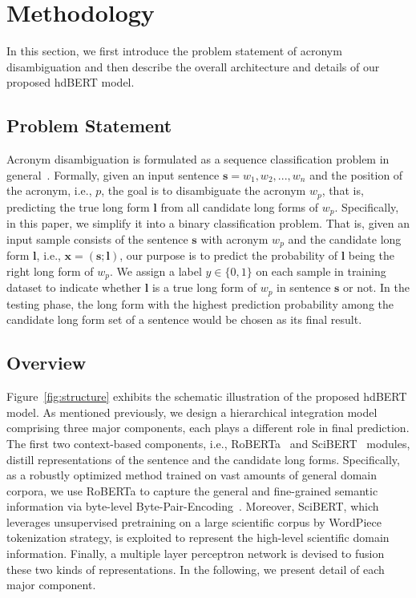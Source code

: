 \section{Methodology}
\label{sec:methodology}
In this section, we first introduce the problem statement of acronym disambiguation and then describe the overall architecture and details of our proposed hdBERT model.
\subsection{Problem Statement}
Acronym disambiguation is formulated as a sequence classification problem in general~\cite{veyseh-et-al-2020-what}.
Formally, given an input sentence $\bm{s}=w_1, w_2, ..., w_n$ and the position of the acronym, i.e., $p$, the goal is to disambiguate the acronym $w_p$, that is, predicting the true long form $\bm{l}$ from all candidate long forms of $w_p$.
Specifically, in this paper, we simplify it into a binary classification problem. That is, given an input sample consists of the sentence $\bm{s}$ with acronym $w_p$ and the candidate long form $\bm{l}$, i.e., $\bm{x}=(\bm{s}; \bm{l})$, our purpose is to predict the probability of $\bm{l}$ being the right long form of $w_p$. 
We assign a label $y \in \{0,1\}$ on each sample in training dataset to indicate whether $\bm{l}$ is a true long form of $w_p$ in sentence $\bm{s}$ or not.
In the testing phase, the long form with the highest prediction probability among the candidate long form set of a sentence would be chosen as its final result.

\subsection{Overview}
Figure~\ref{fig:structure} exhibits the schematic illustration of the proposed hdBERT model.
As mentioned previously, we design a hierarchical integration model comprising three major components, each plays a different role in final prediction.
The first two context-based components, i.e., RoBERTa~\cite{liu2019roberta} and SciBERT~\cite{Beltagy2019SciBERT} modules, distill representations of the sentence and the candidate long forms.
Specifically, as a robustly optimized method trained on vast amounts of general domain corpora, we use RoBERTa to capture the general and fine-grained semantic information via byte-level Byte-Pair-Encoding~\cite{sennrich2016neural}.
Moreover, SciBERT, which leverages unsupervised pretraining on a large scientific corpus by WordPiece~\cite{wu2016google} tokenization strategy, is exploited to represent the high-level scientific domain information.
Finally, a multiple layer perceptron network is devised to fusion these two kinds of representations. In the following, we present detail of each major component.

